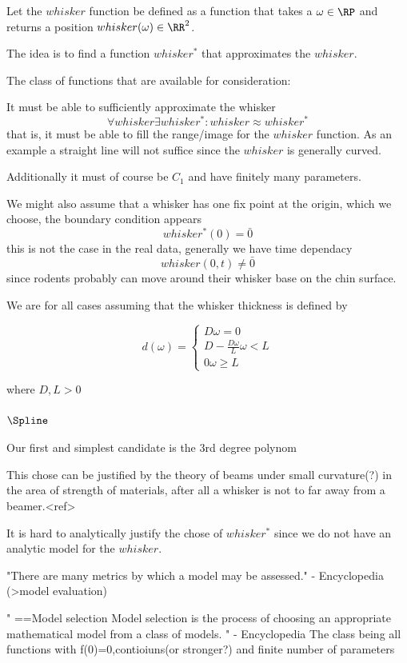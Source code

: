 
Let the $whisker$ function be defined as a function that takes a $\omega\in\RP$
and returns a position $whisker(\omega)\in\RR^2$.

The idea is to find a function $whisker^*$ that approximates the $whisker$.

The class of functions that are available for consideration:

It must be able to sufficiently approximate the whisker
\begin{equation}
    \forall whisker \exists whisker^* : whisker \approx whisker^*
\end{equation}
that is, it must be able to fill the range/image for the $whisker$ function.
As an example a straight line will not suffice since the $whisker$ is generally
curved.

Additionally it must of course be $C_1$ and have finitely many parameters.

We might also assume that a whisker has one fix point at the origin, which we choose, the boundary 
condition appears
\begin{equation}
    whisker^*(0)=\bar{0}
\end{equation}
this is not the case in the real data, 
generally we have time dependacy
\begin{equation}
    whisker(0,t)\neq\bar{0} 
\end{equation}
since rodents probably can move around their whisker base on the chin surface.

We are for all cases assuming that the whisker thickness is defined by

\begin{equation}
    d(\omega) = \begin{cases}
        D \omega=0\\
        D-\frac{D\omega}{L} \omega<L\\
        0 \omega\ge L
    \end{cases}
\end{equation}


where $D,L>0$


\subsubsection{$\Spline$}

Our first and simplest candidate is the 3rd degree polynom

This chose can be justified by the theory of beams under small curvature(?) in the area of 
strength of materials, after all a whisker is not to far away from a beamer.<ref>



It is hard to analytically justify the chose of $whisker^*$ since we do not
have an analytic model for the $whisker$.


"There are many metrics by which a model may be assessed." - Encyclopedia
(>model evaluation)

"
==Model selection
Model selection is the process of choosing an appropriate mathematical model
from a class of models.
" - Encyclopedia 
The class being all functions with f(0)=0,contioiuns(or stronger?) and finite number of parameters


